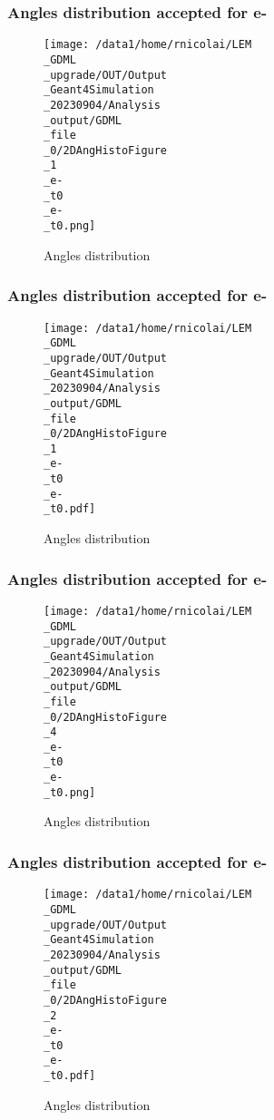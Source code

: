 \documentclass[8pt]{beamer}
\begin{document}
            \begin{frame}
                \frametitle{Angles distribution accepted for e-}
            
        \begin{figure}[h]
            \centering
            \texttt{[image: /data1/home/rnicolai/LEM\\\_GDML\\\_upgrade/OUT/Output\\\_Geant4Simulation\\\_20230904/Analysis\\\_output/GDML\\\_file\\\_0/2DAngHistoFigure\\\_1\\\_e-\\\_t0\\\_e-\\\_t0.png]}
            \caption{Angles distribution}
        \end{figure}
        
            \end{frame}
            
            \begin{frame}
                \frametitle{Angles distribution accepted for e-}
            
        \begin{figure}[h]
            \centering
            \texttt{[image: /data1/home/rnicolai/LEM\\\_GDML\\\_upgrade/OUT/Output\\\_Geant4Simulation\\\_20230904/Analysis\\\_output/GDML\\\_file\\\_0/2DAngHistoFigure\\\_1\\\_e-\\\_t0\\\_e-\\\_t0.pdf]}
            \caption{Angles distribution}
        \end{figure}
        
            \end{frame}
            
            \begin{frame}
                \frametitle{Angles distribution accepted for e-}
            
        \begin{figure}[h]
            \centering
            \texttt{[image: /data1/home/rnicolai/LEM\\\_GDML\\\_upgrade/OUT/Output\\\_Geant4Simulation\\\_20230904/Analysis\\\_output/GDML\\\_file\\\_0/2DAngHistoFigure\\\_4\\\_e-\\\_t0\\\_e-\\\_t0.png]}
            \caption{Angles distribution}
        \end{figure}
        
            \end{frame}
            
            \begin{frame}
                \frametitle{Angles distribution accepted for e-}
            
        \begin{figure}[h]
            \centering
            \texttt{[image: /data1/home/rnicolai/LEM\\\_GDML\\\_upgrade/OUT/Output\\\_Geant4Simulation\\\_20230904/Analysis\\\_output/GDML\\\_file\\\_0/2DAngHistoFigure\\\_2\\\_e-\\\_t0\\\_e-\\\_t0.pdf]}
            \caption{Angles distribution}
        \end{figure}
        
            \end{frame}
            
\end{document}
